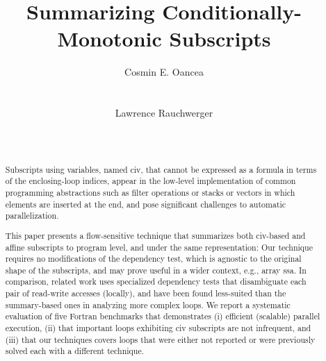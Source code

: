 \documentclass{sig-alternate}
\begin{document}


\title{ Summarizing Conditionally-Monotonic Subscripts}   


\author{
\alignauthor
Cosmin E. Oancea\\
       \\
       \\
\alignauthor
Lawrence Rauchwerger\\
       \\
       \\
}


\maketitle



\begin{abstract}

Subscripts using variables, named {\sc civ}, that cannot be expressed 
as a formula in terms of the enclosing-loop indices,  
appear in the low-level implementation of common programming abstractions 
such as filter operations or stacks or vectors in which elements are 
inserted at the end, and pose significant challenges to automatic
parallelization.

This paper presents a flow-sensitive technique that summarizes 
both {\sc civ}-based and affine subscripts to program level,
and under the same representation: Our technique requires no 
modifications of the dependency test, which is agnostic to the 
original shape of the subscripts, and may prove useful
in a wider context, e.g., array {\sc ssa}. 
%
In comparison, related work uses specialized dependency tests that 
disambiguate each pair of read-write accesses (locally), and 
have been found less-suited than the summary-based ones in analyzing 
more complex loops. 
%
We report a systematic evaluation of five Fortran benchmarks that demonstrates 
  (i) efficient (scalable) parallel execution, 
 (ii) that important loops exhibiting {\sc civ} subscripts are not infrequent, and 
(iii) that our techniques covers loops that were either not reported or were 
        previously solved each with a different technique.
\end{abstract}
\end{document}
